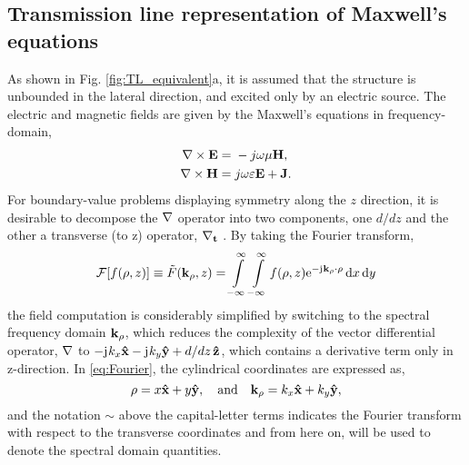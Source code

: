 \documentclass[12pt]{article}
\begin{document}
\subsection{Transmission line representation of Maxwell's equations}
%
As shown in Fig. \ref{fig:TL_equivalent}a, it is assumed that the structure is unbounded in the lateral direction, and excited only by an electric source. The electric and magnetic fields are given by the Maxwell's equations in frequency-domain,
%
\begin{subequations}
  \begin{align}
    \nabla \times{\mathbf{E}} ={}& -j \omega \mu \mathbf{H},
    \label{eq:E}\\
    \nabla \times{\mathbf{H}} ={}& j \omega \varepsilon \mathbf{E} + \mathbf{J}.
    \label{eq:H}
  \end{align}
  \label{eq:MaxE}%
\end{subequations}
%
For boundary-value problems displaying symmetry along the $z$ direction, it is desirable to decompose the $\mathbf{\nabla}$ operator into two components, one $d/dz$ and the other a transverse (to z) operator, $\mathbf{\nabla_t}$ \cite[p. 64]{Felsen1994}. By taking the Fourier transform,
%
\begin{equation}
  \mathcal{F}[f(\mathbf{\rho},z)] \equiv \tilde{F}(\mathbf{k}_{\rho},z) = \int\limits_{-\infty}^\infty \int\limits_{-\infty}^\infty
  f(\mathbf{\rho},z) \mathrm{e}^{-\mathrm{j}\mkern1mu \mathbf{k}_{\rho} \cdot \mathbf{\rho}} \mathop{}\!\mathrm{d}{x} \mathop{}\!\mathrm{d}{y}
  \label{eq:Fourier}
\end{equation}
%
the field computation is considerably simplified by switching to the spectral frequency domain $\mathbf{k_{\rho}}$, which reduces the complexity of the vector differential operator, $\mathbf{\nabla}$ to $-\mathrm{j}\mkern1mu k_x \mathbf{\hat{x}} - \mathrm{j}\mkern1mu k_y \mathbf{\hat{y}} + d/dz\, \mathbf{\hat{z}}$, which contains a derivative term only in z-direction. In \eqref{eq:Fourier}, the cylindrical coordinates are expressed as,
%
\begin{equation}
  \mathbf{\rho} = x\mathbf{\hat{x}} + y\mathbf{\hat{y}}, \quad \text{and} \quad
  \mathbf{k_{\rho}} = k_x\mathbf{\hat{x}} + k_y\mathbf{\hat{y}},
  \label{eq:rect2cylindrical}
\end{equation}
%
and the notation $\sim$ above the capital-letter terms indicates the Fourier transform with respect to the transverse coordinates and from here on, will be used to denote the spectral domain quantities.
\end{document}
